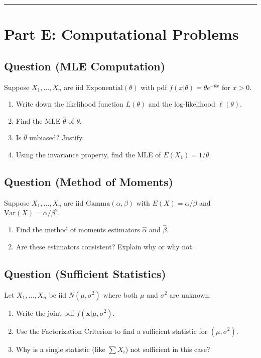 \documentclass[11pt]{article}
\newcounter{qnum}
\newcommand{\question}[1]{\stepcounter{qnum}\subsection*{Question \theqnum \quad (#1)}}
\begin{document}
\vspace{1.5in}

\bigskip
\hrule
\bigskip

\section{Part E: Computational Problems}

\question{MLE Computation}
Suppose $X_1, \ldots, X_n$ are iid $\text{Exponential}(\theta)$ with pdf $f(x|\theta) = \theta e^{-\theta x}$ for $x > 0$.

\begin{enumerate}[label=(\alph*)]
\item Write down the likelihood function $L(\theta)$ and the log-likelihood $\ell(\theta)$.
\item Find the MLE $\hat\theta$ of $\theta$.
\item Is $\hat\theta$ unbiased? Justify.
\item Using the invariance property, find the MLE of $E(X_1) = 1/\theta$.
\end{enumerate}

\vspace{3in}

\question{Method of Moments}
Suppose $X_1, \ldots, X_n$ are iid $\text{Gamma}(\alpha, \beta)$ with $E(X) = \alpha/\beta$ and $\text{Var}(X) = \alpha/\beta^2$.

\begin{enumerate}[label=(\alph*)]
\item Find the method of moments estimators $\hat\alpha$ and $\hat\beta$.
\item Are these estimators consistent? Explain why or why not.
\end{enumerate}

\vspace{2.5in}

\question{Sufficient Statistics}
Let $X_1, \ldots, X_n$ be iid $N(\mu, \sigma^2)$ where both $\mu$ and $\sigma^2$ are unknown.

\begin{enumerate}[label=(\alph*)]
\item Write the joint pdf $f(\mathbf{x} | \mu, \sigma^2)$.
\item Use the Factorization Criterion to find a sufficient statistic for $(\mu, \sigma^2)$.
\item Why is a single statistic (like $\sum X_i$) not sufficient in this case?
\end{enumerate}
\end{document}
